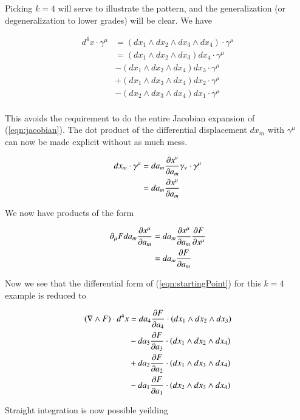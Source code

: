 Picking $k = 4$ will serve to illustrate the pattern, and the generalization (or degeneralization to lower grades) will be clear.  We have

\begin{align*}
d^4 x \cdot \gamma^\mu
&=
( dx_1 \wedge dx_2 \wedge dx_3 \wedge dx_4 ) \cdot \gamma^\mu \\
&= ( dx_1 \wedge dx_2 \wedge dx_3 ) dx_4 \cdot \gamma^\mu \\
&-( dx_1 \wedge dx_2 \wedge dx_4 ) dx_3 \cdot \gamma^\mu \\
&+( dx_1 \wedge dx_3 \wedge dx_4 ) dx_2 \cdot \gamma^\mu \\
&-( dx_2 \wedge dx_3 \wedge dx_4 ) dx_1 \cdot \gamma^\mu  \\
\end{align*}

This avoids the requirement to do the entire Jacobian expansion of (\ref{eqn:jacobian}).  The dot product of the differential displacement $dx_m$ with $\gamma^\mu$ can now be made explicit without as much mess.

\begin{align*}
dx_m \cdot \gamma^\mu 
&=
da_m \PD{a_m}{x^\nu} \gamma_\nu \cdot \gamma^\mu \\
&=
da_m \PD{a_m}{x^\mu} \\
\end{align*}

We now have products of the form

\begin{align*}
\partial_\mu F da_m \PD{a_m}{x^\mu} 
&=
da_m \PD{a_m}{x^\mu} \PD{x^\mu}{F} \\
&=
da_m \PD{a_m}{F} \\
\end{align*}

Now we see that the differential form of (\ref{eqn:startingPoint}) for this $k=4$ example is reduced to

\begin{align*}
( \grad \wedge F ) \cdot d^4 x 
&= da_4 \PD{a_4}{F} \cdot ( dx_1 \wedge dx_2 \wedge dx_3 ) \\
&- da_3 \PD{a_3}{F} \cdot ( dx_1 \wedge dx_2 \wedge dx_4 ) \\
&+ da_2 \PD{a_2}{F} \cdot ( dx_1 \wedge dx_3 \wedge dx_4 ) \\
&- da_1 \PD{a_1}{F} \cdot ( dx_2 \wedge dx_3 \wedge dx_4 ) \\
\end{align*}

Straight integration is now possible yeilding

